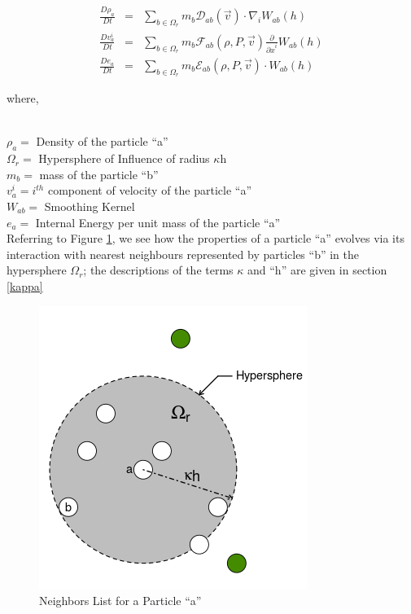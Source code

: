\newpage

\begin{eqnarray}\label{eq:Disc_SPH}
 \frac{D\rho_{a}}{Dt} &=& \sum_{b \in \Omega_{r}} m_{b}{\mathcal{D}}_{ab}(\vec{v})\cdot {\nabla}_{i} W_{ab}(h) \nonumber \\
 \frac{Dv^{i}_{a}}{Dt} &=& \sum_{b \in \Omega_{r}} m_{b}{\mathcal{F}}_{ab}(\rho ,P,\vec{v})\frac{\partial}{{\partial x}^{i}}W_{ab}(h)\\
 \frac{De_{a}}{Dt} &=& \sum_{b \in \Omega_{r}} m_{b}{\mathcal{E}}_{ab}(\rho ,P,\vec{v}) \cdot W_{ab}(h) \nonumber
\end{eqnarray}

{\raggedright{where,}}\\
${\rho}_a = $ Density of the particle ``a'' \\
$\Omega_{r} = $ Hypersphere of Influence of radius $\kappa$h\\
$m_b = $ mass of the particle ``b''\\ 
$v^{i}_{a} = i^{th}$ component of velocity of the particle ``a'' \\
$W_{ab} = $ Smoothing Kernel\\
$e_a = $ Internal Energy per unit mass of the particle ``a''\\

Referring to Figure \ref{fig:nearest_neighbors}, we see how the properties of a particle ``a'' evolves via its interaction with nearest neighbours represented by particles ``b'' in the hypersphere $\Omega_{r}$; the descriptions of the terms $\kappa$ and ``h''  are given in section \ref{kappa}

\begin{figure}[htb!]
\centering
\setlength\fboxsep{0pt}
      \includegraphics[scale=0.6]{figures/SpInfDiscrete_R.png} 
\caption{{\small{Neighbors List for a Particle ``a''}}}
\label{fig:nearest_neighbors}
\end{figure}

